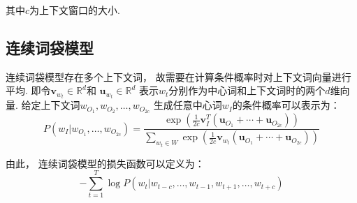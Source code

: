 其中$c$为上下文窗口的大小.

\subsection{连续词袋模型}

连续词袋模型存在多个上下文词，
故需要在计算条件概率时对上下文词向量进行平均.
即令$\mathbf{v}_{w_t}\in\mathbb{R}^d$和
$\mathbf{u}_{w_t}\in\mathbb{R}^d$
表示$w_t$分别作为中心词和上下文词时的两个$d$维向量.
给定上下文词$w_{O_1}, w_{O_2}, \ldots, w_{O_{2c}}$
生成任意中心词$w_I$的条件概率可以表示为：
\begin{equation}
    P\left(w_I|w_{O_1}, \ldots, w_{O_{2c}}\right) = \frac{\exp\left(\frac{1}{2c}\mathbf{v}_I^T\left(\mathbf{u}_{O_1}+\cdots+\mathbf{u}_{O_{2c}}\right)\right)}{\sum_{w_t\in W}\exp\left(\frac{1}{2c}\mathbf{v}_{w_t}\left(\mathbf{u}_{O_1}+\cdots+\mathbf{u}_{O_{2c}}\right)\right)}
\end{equation}

由此，
连续词袋模型的损失函数可以定义为：
\begin{equation}
    -\sum_{t=1}^T\log P\left(w_t|w_{t-c}, \ldots, w_{t-1}, w_{t+1}, \ldots, w_{t+c}\right)
\end{equation}
